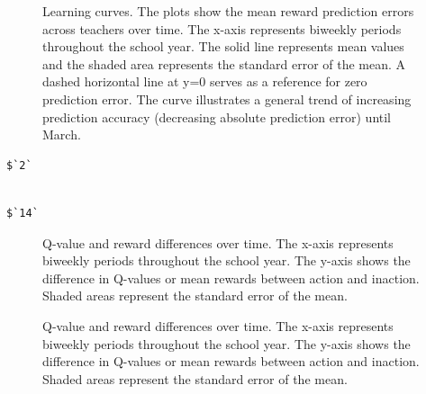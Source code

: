 \documentclass[
  number,
  preprint,
  3p,
  onecolumn]{elsarticle}
\begin{document}
\begin{figure}


\caption{\label{fig-prediction-errors-2}Learning curves. The plots show
the mean reward prediction errors across teachers over time. The x-axis
represents biweekly periods throughout the school year. The solid line
represents mean values and the shaded area represents the standard error
of the mean. A dashed horizontal line at y=0 serves as a reference for
zero prediction error. The curve illustrates a general trend of
increasing prediction accuracy (decreasing absolute prediction error)
until March.}

\end{figure}%

\begin{verbatim}
$`2`
\end{verbatim}

\begin{verbatim}

$`14`
\end{verbatim}

\begin{figure}


\caption{\label{fig-q-value-reward-diff-1}Q-value and reward differences
over time. The x-axis represents biweekly periods throughout the school
year. The y-axis shows the difference in Q-values or mean rewards
between action and inaction. Shaded areas represent the standard error
of the mean.}

\end{figure}%

\begin{figure}


\caption{\label{fig-q-value-reward-diff-2}Q-value and reward differences
over time. The x-axis represents biweekly periods throughout the school
year. The y-axis shows the difference in Q-values or mean rewards
between action and inaction. Shaded areas represent the standard error
of the mean.}

\end{figure}%
\end{document}
